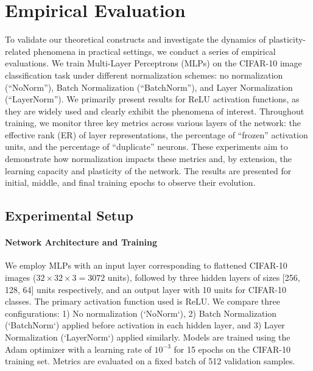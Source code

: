 
\newcommand{\figuredir}{./figures} %

\section{Empirical Evaluation}
\label{sec:empirical_evaluation}

To validate our theoretical constructs and investigate the dynamics of plasticity-related phenomena in practical settings, we conduct a series of empirical evaluations. We train Multi-Layer Perceptrons (MLPs) on the CIFAR-10 image classification task under different normalization schemes: no normalization (``NoNorm''), Batch Normalization (``BatchNorm''), and Layer Normalization (``LayerNorm''). We primarily present results for ReLU activation functions, as they are widely used and clearly exhibit the phenomena of interest. Throughout training, we monitor three key metrics across various layers of the network: the effective rank (ER) of layer representations, the percentage of ``frozen'' activation units, and the percentage of ``duplicate'' neurons. These experiments aim to demonstrate how normalization impacts these metrics and, by extension, the learning capacity and plasticity of the network. The results are presented for initial, middle, and final training epochs to observe their evolution.

\subsection{Experimental Setup}
\paragraph{Network Architecture and Training} We employ MLPs with an input layer corresponding to flattened CIFAR-10 images ($32 \times 32 \times 3 = 3072$ units), followed by three hidden layers of sizes [256, 128, 64] units respectively, and an output layer with 10 units for CIFAR-10 classes. The primary activation function used is ReLU. We compare three configurations: 1) No normalization (`NoNorm`), 2) Batch Normalization (`BatchNorm`) applied before activation in each hidden layer, and 3) Layer Normalization (`LayerNorm`) applied similarly. Models are trained using the Adam optimizer with a learning rate of $10^{-3}$ for 15 epochs on the CIFAR-10 training set. Metrics are evaluated on a fixed batch of 512 validation samples.

